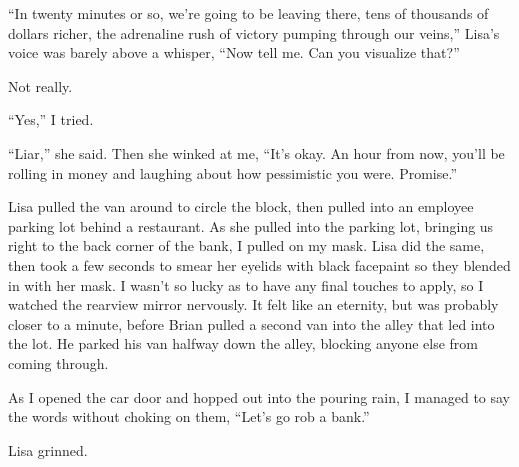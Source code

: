 ``In twenty minutes or so, we're going to be leaving there, tens of thousands of dollars richer, the adrenaline rush of victory pumping through our veins,'' Lisa's voice was barely above a whisper, ``Now tell me.  Can you visualize that?''



Not really.



``Yes,'' I tried.



``Liar,'' she said.  Then she winked at me, ``It's okay.  An hour from now, you'll be rolling in money and laughing about how pessimistic you were.  Promise.''



Lisa pulled the van around to circle the block, then pulled into an employee parking lot behind a restaurant.  As she pulled into the parking lot, bringing us right to the back corner of the bank,  I pulled on my mask.  Lisa did the same, then took a few seconds to smear her eyelids with black facepaint so they blended in with her mask.  I wasn't so lucky as to have any final touches to apply, so I watched the rearview mirror nervously.  It felt like an eternity, but was probably closer to a minute, before Brian pulled a second van into the alley that led into the lot.  He parked his van halfway down the alley, blocking anyone else from coming through.



As I opened the car door and hopped out into the pouring rain, I managed to say the words without choking on them, ``Let's go rob a bank.''



Lisa grinned.

















